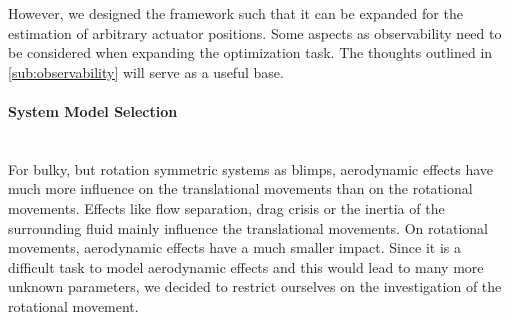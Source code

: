 However, we designed the framework such that it can be expanded for the estimation of arbitrary actuator positions.
Some aspects as observability need to be considered when expanding the optimization task.
The thoughts outlined in \cref{sub:observability} will serve as a useful base.

\paragraph{System Model Selection} ~\\
For bulky, but rotation symmetric systems as blimps, aerodynamic effects have much more influence on the translational movements than on the rotational movements.
Effects like flow separation, drag crisis or the inertia of the surrounding fluid mainly influence the translational movements.
On rotational movements, aerodynamic effects have a much smaller impact.
Since it is a difficult task to model aerodynamic effects and this would lead to many more unknown parameters, we decided to restrict ourselves on the investigation of the rotational movement.

